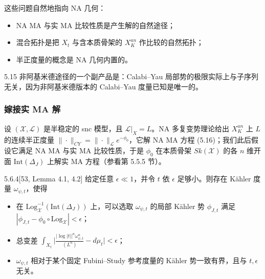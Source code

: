 这些问题自然地指向 NA 几何：
\begin{itemize}
\item NA MA 与实 MA 比较性质是产生解的自然途径；
\item 混合拓扑是把 $X_t$ 与含本质骨架的 $X_K^{an}$ 作比较的自然拓扑；
\item 半正度量的概念是 NA 几何内置的。
\end{itemize}

\begin{remark}{5.15}
非阿基米德途径的一个副产品是：Calabi--Yau 局部势的极限实际上与子序列无关，因为非阿基米德版本的 Calabi--Yau 度量已知是唯一的。
\end{remark}


\subsubsection{嫁接实 MA 解}
设 $(\mathcal X,\mathcal L)$ 是半稳定的 snc 模型，且 $\mathcal L|_X=L$。NA 多复变势理论给出 $X_K^{an}$ 上 $L$ 的连续半正度量 $\|\cdot\|_{CY}=\|\cdot\|_{\mathcal L}e^{-\phi_0}$，它解 NA MA 方程 (5.16)；我们此后假设它满足 NA MA 与实 MA 比较性质，于是 $\phi_0$ 在本质骨架 $Sk(\mathcal X)$ 的各 $n$ 维开面 $\mathrm{Int}(\Delta_J)$ 上解实 MA 方程（参看第 5.5.5 节）。

\begin{proposition}{5.6.4}[53, Lemma 4.1, 4.2]
给定任意 $\epsilon\ll 1$，并令 $t$ 依 $\epsilon$ 足够小。则存在 Kähler 度量 $\omega_{\psi,t}$，使得
\begin{itemize}
\item 在 $\mathrm{Log}_{\mathcal X}^{-1}(\mathrm{Int}(\Delta_J))$ 上，可以选取 $\omega_{\psi,t}$ 的局部 Kähler 势 $\phi_{J,t}$ 满足 $|\phi_{J,t}-\phi_0\circ\mathrm{Log}_{\mathcal X}|<\epsilon$；
\item 总变差 $\int_{X_t}\Big|\frac{|\log|t||^n\omega_{\psi,t}^n}{(L^n)}-d\mu_t\Big|<\epsilon$；
\item $\omega_{\psi,t}$ 相对于某个固定 Fubini--Study 参考度量的 Kähler 势一致有界，且与 $t,\epsilon$ 无关。
\end{itemize}
\end{proposition}


